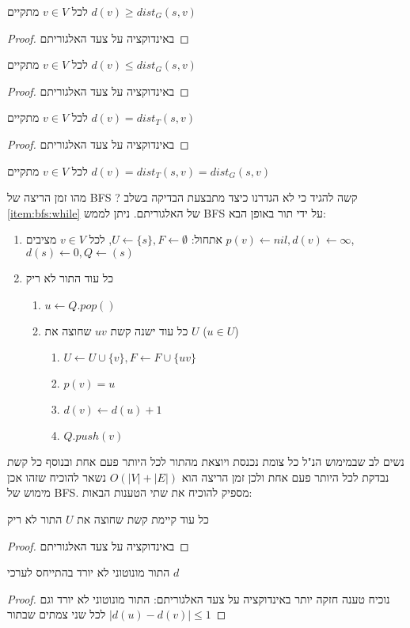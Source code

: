 \begin{claim}
לכל
$v \in V$
מתקיים
$d(v) \geq dist_G(s, v)$
\end{claim}
\begin{proof}
באינדוקציה על צעד האלגוריתם
\end{proof}

\begin{claim}
לכל
$v \in V$
מתקיים
$d(v) \leq dist_G(s,v)$
\end{claim}
\begin{proof}
באינדוקציה על צעד האלגוריתם
\end{proof}

\begin{claim}
לכל
$v \in V$
מתקיים
$d(v) = dist_T(s,v)$
\end{claim}
\begin{proof}
באינדוקציה על צעד האלגוריתם
\end{proof}


\begin{theorem}
לכל
$v \in V$
מתקיים
$d(v) = dist_T(s,v) = dist_G(s,v)$
\end{theorem}
מהו זמן הריצה של BFS ? קשה להגיד כי לא הגדרנו כיצד מתבצעת הבדיקה בשלב 
\ref{item:bfs:while}
של האלגוריתם. 
ניתן לממש BFS על ידי תור באופן הבא:
\begin{enumerate}
\item
אתחול:
$U \leftarrow \{s\}, F \leftarrow \emptyset$, 
לכל 
$v \in V$
מציבים
$p(v) \leftarrow nil, d(v) \leftarrow \infty$,
$d(s) \leftarrow 0, Q \leftarrow (s)$
\item 
כל עוד התור לא ריק 
\begin{enumerate}
	\item
	$u \leftarrow Q.pop()$
\item
כל עוד ישנה קשת 
$uv$
שחוצה את $U$
($u \in U$)
		\begin{enumerate}
		\item
		$U \leftarrow U \cup \{v\}, F \leftarrow F \cup \{uv\}$
		\item
		$p(v) = u$
		\item
		$d(v) \leftarrow d(u) + 1$
		\item
		$Q.push(v)$
		\end{enumerate}
	\end{enumerate}
\end{enumerate}
נשים לב שבמימוש הנ"ל כל צומת נכנסת ויוצאת מהתור לכל היותר פעם אחת 
ובנוסף כל קשת נבדקת לכל היותר פעם אחת ולכן זמן הריצה הוא 
$O(|V| + |E|)$
נשאר להוכיח שזהו אכן מימוש של BFS.
מספיק להוכיח את שתי הטענות הבאות:
\begin{claim}
כל עוד קיימת קשת שחוצה את $U$ התור לא ריק
\end{claim}
\begin{proof}
באינדוקציה על צעד האלגוריתם
\end{proof}

\begin{claim}
התור מונוטוני לא יורד בהתייחס לערכי 
$d$
\end{claim}
\begin{proof}
נוכיח טענה חזקה יותר באינדוקציה על צעד האלגוריתם: 
התור מונוטוני לא יורד וגם 
$|d(u) - d(v)| \leq 1$
לכל שני צמתים שבתור
\end{proof}
